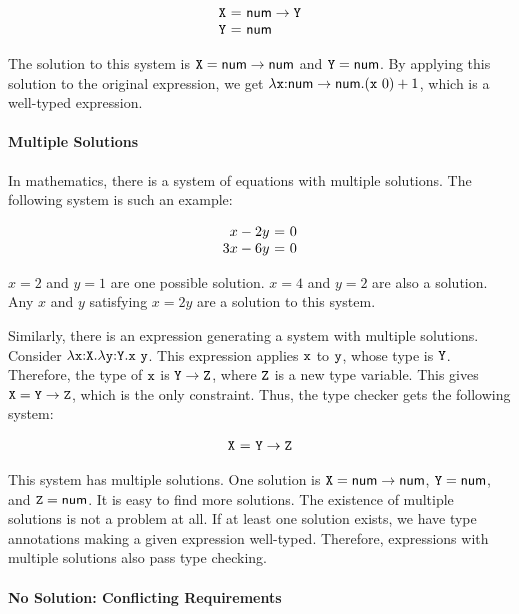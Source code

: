 \[
\begin{array}{r@{~}c@{~}l}
  \cX &=& \tarrow{\tnum}{\cY} \\
  \cY &=& \tnum \\
\end{array}
\]

The solution to this system is $\texttt{X}=\textsf{num}\rightarrow\textsf{num}$ and $\texttt{Y}=\textsf{num}$. By
applying this solution to the original expression, we get
$\lambda\texttt{x}{:}\textsf{num}\rightarrow\textsf{num}.(\texttt{x}\ 0)+1$, which is a
well-typed \plang expression.

\paragraph{Multiple Solutions}

In mathematics, there is a system of equations with multiple solutions. The
following system is such an example:

\[
\begin{array}{r@{~}c@{~}l}
  x - 2y &=& 0 \\
  3x - 6y &=& 0 \\
\end{array}
\]

$x=2$ and $y=1$ are one possible solution. $x=4$ and $y=2$ are also a solution.
Any $x$ and $y$ satisfying $x=2y$ are a solution to this system.

Similarly, there is an expression generating a system with multiple solutions.
Consider $\lambda\texttt{x}{:}\texttt{X}.\lambda\texttt{y}{:}\texttt{Y}.\texttt{x}\ \texttt{y}$. This
expression applies $\texttt{x}$ to $\texttt{y}$, whose type is $\texttt{Y}$. Therefore, the type
of $\texttt{x}$ is $\texttt{Y}\rightarrow\texttt{Z}$, where $\texttt{Z}$ is a new type variable. This gives
$\texttt{X}=\texttt{Y}\rightarrow\texttt{Z}$, which is the only constraint. Thus, the type checker
gets the following system:

\[
\begin{array}{r@{~}c@{~}l}
  \cX &=& \tarrow{\cY}{\cZ} \\
\end{array}
\]

This system has multiple solutions. One solution is $\texttt{X}=\textsf{num}\rightarrow\textsf{num}$,
$\texttt{Y}=\textsf{num}$, and $\texttt{Z}=\textsf{num}$. It is easy to find more solutions. The existence
of multiple solutions is not a problem at all. If at least one solution exists,
we have type annotations making a given expression well-typed. Therefore,
expressions with multiple solutions also pass type checking.

\paragraph{No Solution: Conflicting Requirements}

